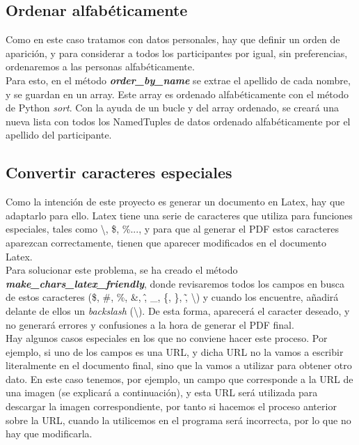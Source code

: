 \documentclass[a4paper, 12pt]{book}
\begin{document}
\subsection{Ordenar alfabéticamente}
\label{subsec:orden}
Como en este caso tratamos con datos personales, hay que definir un orden de aparición, y para considerar a todos los participantes por igual, sin preferencias, ordenaremos a las personas alfabéticamente.\\

Para esto, en el método \textbf{\textit{order\_by\_name}} se extrae el apellido de cada nombre, y se guardan en un array. Este array es ordenado alfabéticamente con el método de Python \textit{sort}. Con la ayuda de un bucle y del array ordenado, se creará una nueva lista con todos los NamedTuples de datos ordenado alfabéticamente por el apellido del participante.


\subsection{Convertir caracteres especiales}
\label{subsec:especialCars}
Como la intención de este proyecto es generar un documento en Latex, hay que adaptarlo para ello. Latex tiene una serie de caracteres que utiliza para funciones especiales, tales como \textbackslash, \$, \%..., y para que al generar el PDF estos caracteres aparezcan correctamente, tienen que aparecer modificados en el documento Latex.\\

Para solucionar este problema, se ha creado el método \textbf{\textit{make\_chars\_latex\_friendly}}, donde revisaremos todos los campos en busca de estos caracteres (\$, \#, \%, \&, \^, \_, \{, \}, \~ , \textbackslash) y cuando los encuentre, añadirá delante de ellos un \textit{backslash} (\textbackslash). De esta forma, aparecerá el caracter deseado, y no generará errores y confusiones a la hora de generar el PDF final.\\

Hay algunos casos especiales en los que no conviene hacer este proceso. Por ejemplo, si uno de los campos es una URL, y dicha URL no la vamos a escribir literalmente en el documento final, sino que la vamos a utilizar para obtener otro dato. En este caso tenemos, por ejemplo, un campo que corresponde a la URL de una imagen (se explicará a continuación), y esta URL será utilizada para descargar la imagen correspondiente, por tanto si hacemos el proceso anterior sobre la URL, cuando la utilicemos en el programa será incorrecta, por lo que no hay que modificarla.
\end{document}
